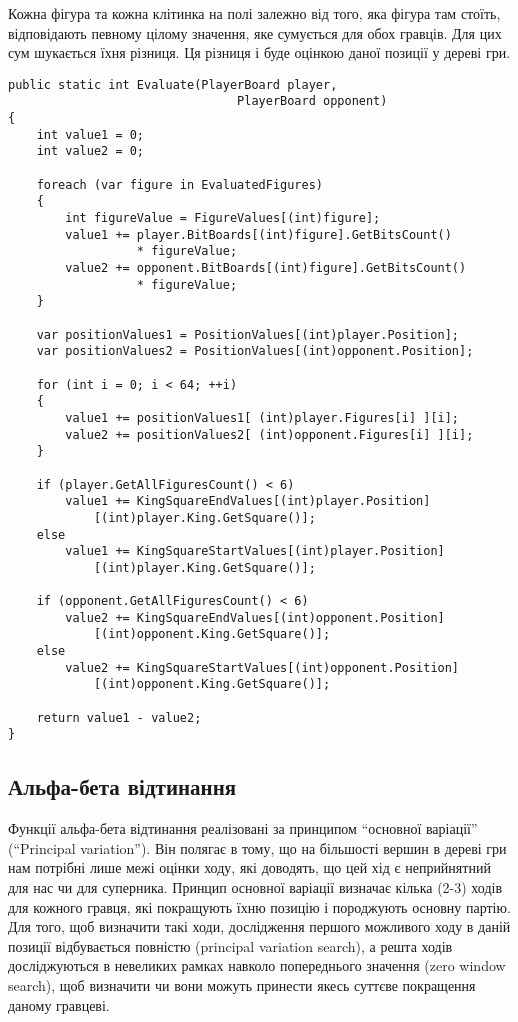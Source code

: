 \documentclass[12pt,a4paper]{article}
\begin{document}
Кожна фігура та кожна клітинка на полі залежно від того, яка фігура там
стоїть, відповідають певному цілому значення, яке сумується для обох гравців.
Для цих сум шукається їхня різниця. Ця різниця і буде оцінкою даної позиції у
дереві гри.

\singlespacing
\begin{lstlisting}
public static int Evaluate(PlayerBoard player,
                                PlayerBoard opponent)
{
    int value1 = 0;
    int value2 = 0;

    foreach (var figure in EvaluatedFigures)
    {
        int figureValue = FigureValues[(int)figure];
        value1 += player.BitBoards[(int)figure].GetBitsCount()
                  * figureValue;
        value2 += opponent.BitBoards[(int)figure].GetBitsCount()
                  * figureValue;
    }

    var positionValues1 = PositionValues[(int)player.Position];
    var positionValues2 = PositionValues[(int)opponent.Position];

    for (int i = 0; i < 64; ++i)
    {
        value1 += positionValues1[ (int)player.Figures[i] ][i];
        value2 += positionValues2[ (int)opponent.Figures[i] ][i];
    }

    if (player.GetAllFiguresCount() < 6)
        value1 += KingSquareEndValues[(int)player.Position]
            [(int)player.King.GetSquare()];
    else
        value1 += KingSquareStartValues[(int)player.Position]
            [(int)player.King.GetSquare()];

    if (opponent.GetAllFiguresCount() < 6)
        value2 += KingSquareEndValues[(int)opponent.Position]
            [(int)opponent.King.GetSquare()];
    else
        value2 += KingSquareStartValues[(int)opponent.Position]
            [(int)opponent.King.GetSquare()];

    return value1 - value2;
}
\end{lstlisting}

\fontsize{14pt}{6mm}\selectfont

\subsection{Альфа-бета відтинання}

Функції альфа-бета відтинання реалізовані за принципом ``основної варіації''
(``Principal variation''). Він полягає в тому, що на більшості вершин в дереві
гри нам потрібні лише межі оцінки ходу, які доводять, що цей хід є
неприйнятний для нас чи для суперника. Принцип основної варіації визначає
кілька (2-3) ходів для кожного гравця, які покращують їхню позицію і
породжують основну партію. Для того, щоб визначити такі ходи, дослідження
першого можливого ходу в даній позиції відбувається повністю (principal
variation search), а решта ходів досліджуються в невеликих рамках навколо
попереднього значення (zero window search), щоб визначити чи вони можуть
принести якесь суттєве покращення даному гравцеві.
\end{document}
